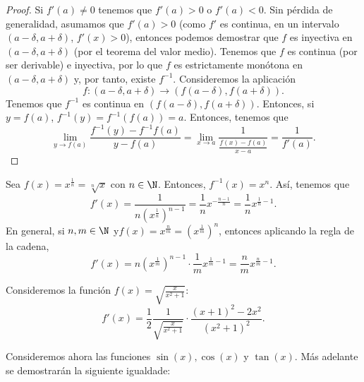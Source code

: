 \begin{proof}
Si $\displaystyle f'\left(a\right) \neq 0 $ tenemos que $\displaystyle f'\left(a\right) > 0 $ o $\displaystyle f'\left(a\right) < 0 $. Sin pérdida de generalidad, asumamos que $\displaystyle f'\left(a\right) > 0 $ (como $\displaystyle f' $ es continua, en un intervalo $\displaystyle \left(a-\delta, a + \delta \right) $, $\displaystyle f'\left(x\right) >0$), entonces podemos demostrar que $\displaystyle f $ es inyectiva en $\displaystyle \left(a - \delta, a + \delta \right) $ (por el teorema del valor medio). Tenemos que $\displaystyle f $ es continua (por ser derivable) e inyectiva, por lo que $\displaystyle f $ es estrictamente monótona en $\displaystyle \left(a-\delta, a + \delta \right) $ y, por tanto, existe $\displaystyle f^{-1} $. Consideremos la aplicación
\[ f: \left(a - \delta, a + \delta \right) \to \left(f\left(a-\delta \right), f\left(a+\delta \right)\right) .\]
 Tenemos que $\displaystyle f^{-1} $ es continua en $\displaystyle \left(f\left(a-\delta \right), f\left(a+\delta \right)\right) $. Entonces, si $\displaystyle y = f\left(a\right) $, $\displaystyle f^{-1}\left(y\right) = f^{-1}\left(f\left(a\right)\right) = a $. Entonces, tenemos que 
\[\lim_{y \to f\left(a\right)}\frac{f^{-1}\left(y\right)-f^{-1}f\left(a\right)}{y-f\left(a\right)} = \lim_{x \to a}\frac{1}{\frac{f\left(x\right)-f\left(a\right)}{x-a}} = \frac{1}{f'\left(a\right)} .\]
\end{proof}
\begin{observation}
\normalfont Sea $\displaystyle f\left(x\right) = x^{\frac{1}{n}} = \sqrt[n]{x} $ con $\displaystyle n \in \N $. Entonces, $\displaystyle f^{-1}\left(x\right) = x^{n} $. Así, tenemos que
	\[f'\left(x\right) = \frac{1}{n\left(x^{\frac{1}{n}}\right)^{n-1}} = \frac{1}{n}x^{-\frac{n-1}{n}} = \frac{1}{n}x^{\frac{1}{n}-1} .\]
En general, si $\displaystyle n,m \in \N $ y$\displaystyle f\left(x\right) = x^{\frac{n}{m}} = \left(x^{\frac{1}{m}}\right)^{n} $, entonces aplicando la regla de la cadena, 
\[f'\left(x\right) = n\left(x^{\frac{1}{m}}\right)^{n-1} \cdot \frac{1}{m} x^{\frac{1}{m}-1} = \frac{n}{m}x^{\frac{n}{m}-1} .\]
\end{observation}
\begin{eg}
\normalfont Consideremos la función $\displaystyle f\left(x\right) = \sqrt{ \frac{x}{x^{2}+1}} $:
\[f'\left(x\right) = \frac{1}{2} \frac{1}{\sqrt{\frac{x}{x^{2}+1}}} \cdot \frac{\left(x+1\right)^{2}-2x^{2}}{\left(x^{2}+1\right)^{2}} .\]
\end{eg}
Consideremos ahora las funciones $\displaystyle \sin\left(x\right), \cos\left(x\right) $ y $\displaystyle \tan\left(x\right) $. Más adelante se demostrarán la siguiente igualdade:
